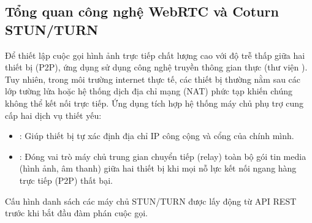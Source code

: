 \subsection{Tổng quan công nghệ WebRTC và Coturn STUN/TURN}
Để thiết lập cuộc gọi hình ảnh trực tiếp chất lượng cao với độ trễ thấp giữa hai thiết bị (P2P), ứng dụng sử dụng công nghệ truyền thông gian thực  (thư viện ).
Tuy nhiên, trong môi trường internet thực tế, các thiết bị thường nằm sau các lớp tường lửa hoặc hệ thống dịch địa chỉ mạng (NAT) phức tạp khiến chúng không thể kết nối trực tiếp. Ứng dụng tích hợp hệ thống máy chủ phụ trợ  cung cấp hai dịch vụ thiết yếu:
\begin{itemize}
    \item {}: Giúp thiết bị tự xác định địa chỉ IP công cộng và cổng của chính mình.
    \item {}: Đóng vai trò máy chủ trung gian chuyển tiếp (relay) toàn bộ gói tin media (hình ảnh, âm thanh) giữa hai thiết bị khi mọi nỗ lực kết nối ngang hàng trực tiếp (P2P) thất bại.
\end{itemize}
Cấu hình danh sách các máy chủ STUN/TURN được lấy động từ API REST  trước khi bắt đầu đàm phán cuộc gọi.


